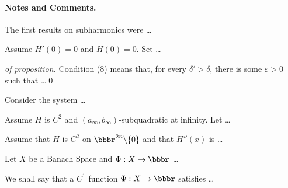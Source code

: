 \paragraph{Notes and Comments.}
The first results on subharmonics were \dots
%
\begin{proposition}
Assume $H'(0)=0$ and $ H(0)=0$. Set \dots
\end{proposition}
\begin{proof}[of proposition]
Condition (8) means that, for every $\delta'>\delta$, there is
some $\varepsilon>0$ such that \dots \qed
\end{proof}
%
\begin{example}
Consider the system \dots
\end{example}
\begin{corollary}
Assume $H$ is $C^{2}$ and
$\left(a_{\infty}, b_{\infty}\right)$-subquadratic
at infinity. Let \dots
\end{corollary}
\begin{lemma}
Assume that $H$ is $C^{2}$ on $\bbbr^{2n}\backslash \{0\}$
and that $H''(x)$ is \dots
\end{lemma}
\begin{theorem}
Let $X$ be a Banach Space and $\Phi:X\to\bbbr$ \dots
\end{theorem}
\begin{definition}
We shall say that a $C^{1}$ function $\Phi:X\to\bbbr$ satisfies \dots
\end{definition}
%

